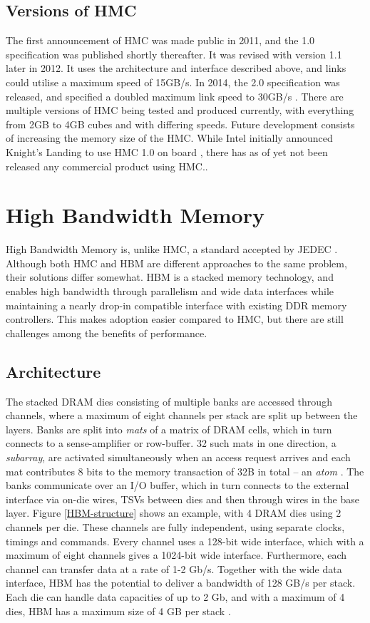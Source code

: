 \subsection{Versions of HMC}
The first announcement of HMC was made public in 2011, and the 1.0 specification was published shortly thereafter. It was revised with version 1.1 later in 2012. It uses the architecture and interface described above, and links could utilise a maximum speed of 15GB/s. In 2014, the 2.0 specification was released, and specified a doubled maximum link speed to 30GB/s \cite{hybrid2014hybrid}. There are multiple versions of HMC being tested and produced currently, with everything from 2GB to 4GB cubes and with differing speeds. Future development consists of increasing the memory size of the HMC. While Intel initially announced Knight's Landing to use HMC 1.0 on board \cite{micron2014ikl}, there has as of yet not been released any commercial product using HMC.. 


\section{High Bandwidth Memory}
High Bandwidth Memory is, unlike HMC, a standard accepted by JEDEC \cite{standard2013high}. Although both HMC and HBM are different approaches to the same problem, their solutions differ somewhat. HBM is a stacked memory technology, and enables high bandwidth through parallelism and wide data interfaces while maintaining a nearly drop-in compatible interface with existing DDR memory controllers. This makes adoption easier compared to HMC, but there are still challenges among the benefits of performance.

\subsection{Architecture}
The stacked DRAM dies consisting of multiple banks are accessed through channels, where a maximum of eight channels per stack are split up between the layers. Banks are split into \emph{mats} of a matrix of DRAM cells, which in turn connects to a sense-amplifier or row-buffer. 32 such mats in one direction, a \emph{subarray}, are activated simultaneously when an access request arrives and each mat contributes 8 bits to the memory transaction of 32B in total -- an \emph{atom} \cite{7920815}. The banks communicate over an I/O buffer, which in turn connects to the external interface via on-die wires, TSVs between dies and then through wires in the base layer. Figure \ref{HBM-structure} shows an example, with 4 DRAM dies using 2 channels per die. These channels are fully independent, using separate clocks, timings and commands. Every channel uses a 128-bit wide interface, which with a maximum of eight channels gives a 1024-bit wide interface. Furthermore, each channel can transfer data at a rate of 1-2 Gb/s. Together with the wide data interface, HBM has the potential to deliver a bandwidth of 128 GB/s per stack. Each die can handle data capacities of up to 2 Gb, and with a maximum of 4 dies, HBM has a maximum size of 4 GB per stack \cite{7478812}.
\bigskip

